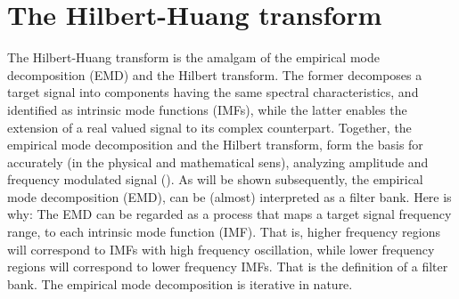 \documentclass[../Main/thesis.tex]{subfiles}
\begin{document}
 \section{The Hilbert-Huang transform}
 \label{sec:emd}
 The Hilbert-Huang transform is the amalgam of the empirical mode decomposition (EMD) and the Hilbert transform.
  The former decomposes a target signal into components having the same spectral characteristics, and identified as intrinsic mode functions (IMFs), while the latter enables the extension of a real valued signal to its complex counterpart. Together, the empirical mode decomposition and the Hilbert transform, form the basis for accurately (in the physical and mathematical sens), analyzing amplitude and frequency modulated signal (\cite{huang98}).
\justify
As will be shown subsequently, the empirical mode decomposition (EMD), can be (almost) interpreted as a filter bank. Here is why: The EMD can be regarded as a process that maps a target signal frequency range, to each intrinsic mode function (IMF). That is, higher frequency regions will correspond to IMFs with high frequency oscillation, while lower frequency regions will correspond to lower frequency IMFs. That is the definition of a filter bank. The empirical mode decomposition is iterative in nature.
\end{document}
